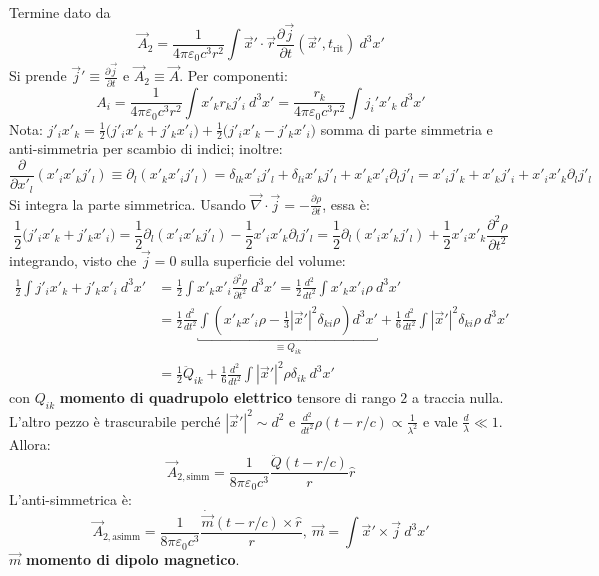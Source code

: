 \documentclass[10pt, a4paper]{scrartcl}
\numberwithin{equation}{subsection}
\theoremstyle{style1}
\begin{document}
Termine dato da 
\[
\vec{A}_2 = \frac{1}{4\pi \varepsilon _0 c^3 r^2}  \int \vec{x}' \cdot \vec{r} \frac{\partial \vec{j}}{\partial t} (\vec{x}', t_\text{rit}) \ d^3 x' 
\] 
Si prende $\vec{j}' \equiv \frac{\partial \vec{j}}{\partial t} $ e $\vec{A}_2 \equiv \vec{A}$. Per componenti:
\[
A_i = \frac{1}{4\pi \varepsilon _0 c^3 r^2} \int x'_k r_k j'_i \ d^3 x' = \frac{r_k}{4\pi \varepsilon _0 c^3 r^2}\int j_i ' x'_k \ d^3 x' 
\] 
Nota: $j'_i x'_k = \frac{1}{2}\big(j'_i x'_k + j'_k x'_i\big) + \frac{1}{2}\big(j'_i x'_k - j'_k x'_i\big)$ somma di parte simmetria e anti-simmetria per scambio di indici; inoltre:
\[
\frac{\partial}{\partial x'_l}(x'_ix'_k j'_l)\equiv \partial _l (x'_k x'_i j'_l ) = \delta _{lk} x'_i j'_l + \delta _{li} x'_k j'_l + x'_k x'_i \partial _l j'_l= x'_i j'_k + x'_k j'_i + x'_i x'_k \partial _l j'_l
\] 
Si integra la parte simmetrica. Usando $\vec{\nabla }\cdot \vec{j} = - \frac{\partial \rho }{\partial t} $, essa \`e:
\[
\frac{1}{2}\big(j'_i x'_k + j'_k x'_i\big) = \frac{1}{2} \partial _l(x'_i x'_k j'_l) - \frac{1}{2} x'_i x'_k \partial _l j'_l= \frac{1}{2} \partial _l(x'_i x'_k j'_l) + \frac{1}{2} x'_i x'_k \frac{\partial ^2 \rho }{\partial t^2} 
\] 
integrando, visto che $\vec{j}=0$ sulla superficie del volume:
\begin{equation}
	\begin{split}
		\frac{1}{2}\int j'_i x'_k + j'_k x'_i \ d^3x'&= \frac{1}{2} \int x'_k x'_i \frac{\partial ^2 \rho }{\partial t^2} \ d^3x' = \frac{1}{2} \frac{d ^2}{d t^2} \int x'_k x'_i \rho  \ d^3 x'\\
							     &= \frac{1}{2} \frac{d ^2}{d t^2} \underbracket{\int \left(x'_k x'_i \rho  - \frac{1}{3} \left\lvert \vec{x}' \right\rvert ^2 \delta _{ki} \rho \right) d^3x'}_{\equiv Q_{ik} }  + \frac{1}{6} \frac{d ^2}{d t^2} \int \left\lvert \vec{x}' \right\rvert ^2 \delta _{ki} \rho \ d^ 3 x'  \\
							     &=\frac{1}{2}\ddot{Q}_{ik} + \frac{1}{6} \frac{d ^2}{d t^2} \int \left\lvert \vec{x}' \right\rvert ^2 \rho  \delta _{ik} \ d^3 x' 
	\end{split}
\end{equation}
con $Q_{ik} $ \textbf{momento di quadrupolo elettrico} tensore di rango $2$ a traccia nulla. L'altro pezzo \`e trascurabile perch\'e $\left\lvert \vec{x}' \right\rvert ^2 \sim d^2$ e $\frac{d ^2}{d t^2} \rho (t - r / c) \propto \frac{1}{\lambda ^2}$ e vale $\frac{d}{\lambda }\ll 1$. Allora:
\begin{equation}
	\vec{A}_{2, \text{simm}} = \frac{1}{8 \pi \varepsilon _0 c^3} \frac{\ddot{Q}(t - r/c)}{r} \hat{r}
\end{equation}
L'anti-simmetrica \`e:
\begin{equation}
	\vec{A}_{2,\text{asimm}} = \frac{1}{8 \pi \varepsilon _0 c^3} \frac{\dot{\vec{m}}(t- r /c) \times \hat{r}}{r}, \ \vec{m}=\int \vec{x}' \times  \vec{j} \ d^3x' 
\end{equation}
$\vec{m}$ \textbf{momento di dipolo magnetico}. 
\end{document}
